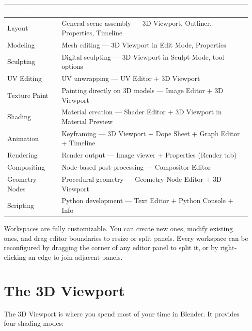 \documentclass[11pt,letterpaper,twoside,openright]{book}
\newcommand{\tableheader}[1]{\textbf{\sffamily\textcolor{white}{#1}}}
\begin{document}
\begin{center}
\begin{tabularx}{\textwidth}{L{3.5cm}X}
\toprule
{}
\tableheader{Workspace} & \tableheader{Purpose} \\
\midrule
Layout & General scene assembly --- 3D Viewport, Outliner, Properties, Timeline \\
Modeling & Mesh editing --- 3D Viewport in Edit Mode, Properties \\
Sculpting & Digital sculpting --- 3D Viewport in Sculpt Mode, tool options \\
UV Editing & UV unwrapping --- UV Editor + 3D Viewport \\
Texture Paint & Painting directly on 3D models --- Image Editor + 3D Viewport \\
Shading & Material creation --- Shader Editor + 3D Viewport in Material Preview \\
Animation & Keyframing --- 3D Viewport + Dope Sheet + Graph Editor + Timeline \\
Rendering & Render output --- Image viewer + Properties (Render tab) \\
Compositing & Node-based post-processing --- Compositor Editor \\
Geometry Nodes & Procedural geometry --- Geometry Node Editor + 3D Viewport \\
Scripting & Python development --- Text Editor + Python Console + Info \\
\bottomrule
\end{tabularx}
\end{center}

Workspaces are fully customizable. You can create new ones, modify existing ones, and drag editor boundaries to resize or split panels. Every workspace can be reconfigured by dragging the corner of any editor panel to split it, or by right-clicking an edge to join adjacent panels.

\section{The 3D Viewport}

The 3D Viewport is where you spend most of your time in Blender. It provides four shading modes:
\end{document}
